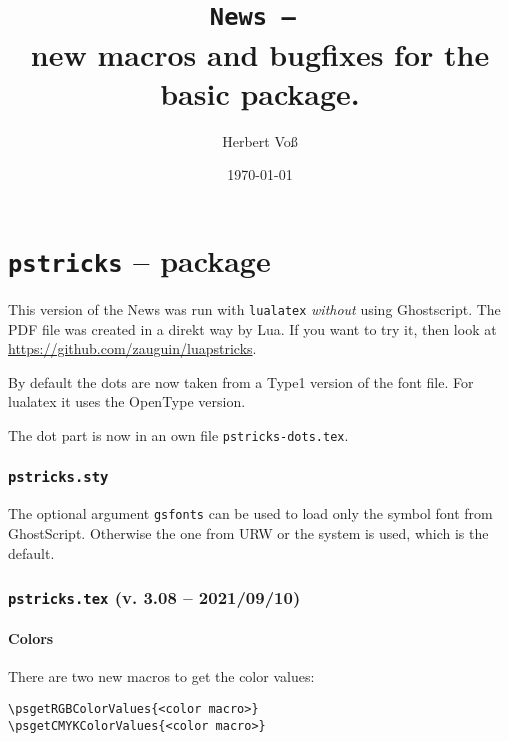\documentclass[11pt,english,BCOR=10mm,DIV=12,bibliography=totoc,parskip=false,headings=small,
    headinclude=false,footinclude=false,twoside,usegeometry]{pst-doc}
\begin{document}
\title{\texttt{News -- \the\year}\\ \Large new macros and bugfixes for the basic package.}
\author{Herbert Voß}
\date{\today}

\settitle

\tableofcontents

\part{\texttt{pstricks} -- package}

This version of the News was run with \verb|lualatex| \emph{without} using Ghostscript.
The PDF file was created in a direkt way by Lua. If you want to try it, then look
at \url{https://github.com/zauguin/luapstricks}.

By default the dots are now taken from a Type1 version of the font file. For
lualatex it uses the OpenType version.

The dot part is now in an own file \texttt{pstricks-dots.tex}.

\section{\texttt{pstricks.sty}}
The optional argument \texttt{gsfonts} can be used to load only the symbol font from GhostScript.
Otherwise the one from URW or the system is used, which is the default.



\section{\texttt{pstricks.tex} (v. 3.08 -- 2021/09/10)}

\subsection{Colors}

There are two new macros to get the color values:

\begin{verbatim}
\psgetRGBColorValues{<color macro>}
\psgetCMYKColorValues{<color macro>}
\end{verbatim}
\end{document}
